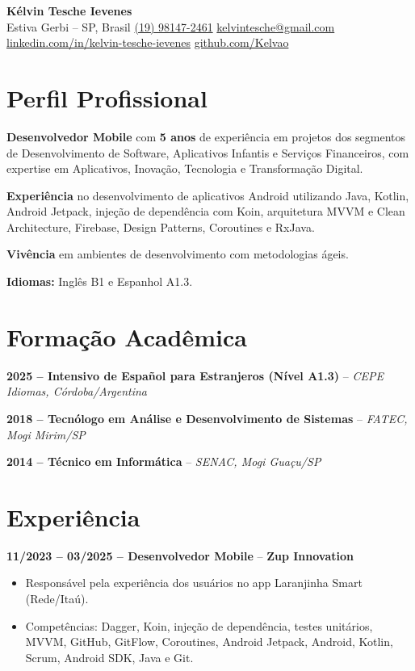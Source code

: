\documentclass[11pt,a4paper]{article}
\newcommand{\companyname}[1]{\textcolor{secondarycolor}{\textbf{#1}}}
\newcommand{\contactsep}{\quad\textcolor{accentcolor}{\textbullet}\quad}
\begin{document}
{\Huge \textbf{\textcolor{primarycolor}{Kélvin Tesche Ievenes}}}\\[0.4em]
\small
Estiva Gerbi -- SP, Brasil
\contactsep
\href{tel:+5519981472461}{(19) 98147-2461}
\contactsep
\href{mailto:kelvintesche@gmail.com}{kelvintesche@gmail.com}\\[0.3em]
\href{https://linkedin.com/in/kelvin-tesche-ievenes}{linkedin.com/in/kelvin-tesche-ievenes}
\contactsep
\href{https://github.com/Kelvao}{github.com/Kelvao}
\normalsize

\section*{Perfil Profissional}
\textbf{Desenvolvedor Mobile} com \textbf{5 anos} de experiência em projetos dos segmentos de Desenvolvimento de Software, Aplicativos Infantis e Serviços Financeiros, com expertise em Aplicativos, Inovação, Tecnologia e Transformação Digital.

\textbf{Experiência} no desenvolvimento de aplicativos Android utilizando Java, Kotlin, Android Jetpack, injeção de dependência com Koin, arquitetura MVVM e Clean Architecture, Firebase, Design Patterns, Coroutines e RxJava.

\textbf{Vivência} em ambientes de desenvolvimento com metodologias ágeis.

\textbf{Idiomas:} Inglês B1 e Espanhol A1.3.

\section*{Formação Acadêmica}

\textbf{2025 -- Intensivo de Español para Estranjeros (Nível A1.3)} -- \textit{CEPE Idiomas, Córdoba/Argentina}

\textbf{2018 -- Tecnólogo em Análise e Desenvolvimento de Sistemas} -- \textit{FATEC, Mogi Mirim/SP}

\textbf{2014 -- Técnico em Informática} -- \textit{SENAC, Mogi Guaçu/SP}

\section*{Experiência}

\textbf{11/2023 -- 03/2025 -- Desenvolvedor Mobile} -- \companyname{Zup Innovation}
\begin{itemize}
    \item Responsável pela experiência dos usuários no app Laranjinha Smart (Rede/Itaú).
    \item Competências: Dagger, Koin, injeção de dependência, testes unitários, MVVM, GitHub, GitFlow, Coroutines, Android Jetpack, Android, Kotlin, Scrum, Android SDK, Java e Git.
\end{itemize}
\end{document}
